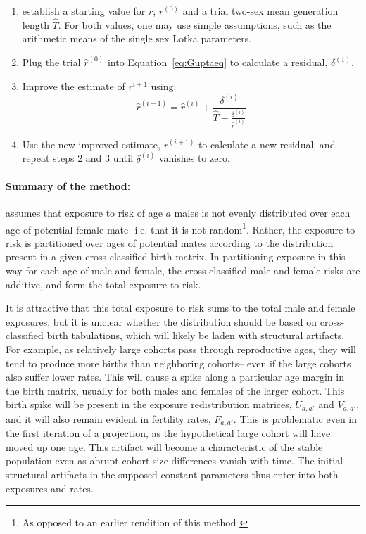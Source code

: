 \begin{enumerate}
  \item establish a starting value for $r$,
$r^{(0)}$ and a trial two-sex mean generation length
$\widehat{T}$. For both values, one may use simple
assumptions, such as the arithmetic means of the single sex Lotka parameters.
  \item Plug the trial $\widehat{r}^{(0)}$ into Equation~\eqref{eq:Guptaeq}
  to calculate a residual, $\delta ^{(1)}$.
  \item Improve the estimate of $r^{i+1}$ using:
  \begin{equation}
  \widehat{r}^{(i+1)} = \widehat{r}^{(i)} + \frac{\delta^{(i)}}{\widehat{T} -
\frac{\delta ^{(i)}}{\widehat{r}^{(i)} }}
  \end{equation}
  \item Use the new improved estimate, $r^{(i+1)}$ to calculate a new residual,
  and repeat steps 2 and 3 until $\delta^{(i)}$ vanishes to zero.
\end{enumerate}

\paragraph{Summary of the method: } \citet{gupta1978alternative} assumes that exposure to risk of
 age $a$ males is not evenly distributed over each age of potential female mate-
 i.e. that it is not random\footnote{As opposed to an earlier rendition of
 this method \citep{gupta1972two}}. Rather, the exposure to risk is partitioned
 over ages of potential mates according to the distribution present in a given 
 cross-classified birth matrix. In partitioning exposure in this way for each
 age of male and female, the cross-classified male and female risks are additive, and
 form the total exposure to risk. 
 
 It is attractive that this total exposure to
 risk sums to the total male and female exposures, but it is unclear whether the
 distribution should be based on cross-classified birth tabulations, which will
 likely be laden with structural artifacts. For example, as relatively large
 cohorts pass through reproductive ages, they will tend to produce more births
 than neighboring cohorts-- even if the large cohorts also suffer lower rates.
 This will cause a spike along a particular age margin in the birth matrix,
 usually for both males and females of the larger cohort. This birth spike will
 be present in the exposure redistribution matrices, $U_{a,a'}$ and
 $V_{a,a'}$, and it will also remain evident in fertility rates, $F_{a,a'}$.
 This is problematic even in the first iteration of a projection, as the
 hypothetical large cohort will have moved up one age. This artifact will
become a characteristic of the stable population even as abrupt cohort size
differences vanish with time. The initial structural artifacts in the supposed
constant parameters thus enter into both exposures and rates. 


